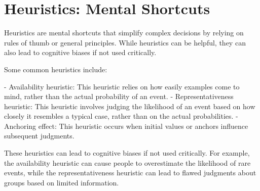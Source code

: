 \section{Heuristics: Mental Shortcuts}
Heuristics are mental shortcuts that simplify complex decisions by relying on rules of thumb or general principles. While heuristics can be helpful, they can also lead to cognitive biases if not used critically.

Some common heuristics include:

- Availability heuristic: This heuristic relies on how easily examples come to mind, rather than the actual probability of an event.
- Representativeness heuristic: This heuristic involves judging the likelihood of an event based on how closely it resembles a typical case, rather than on the actual probabilities.
- Anchoring effect: This heuristic occurs when initial values or anchors influence subsequent judgments.

These heuristics can lead to cognitive biases if not used critically. For example, the availability heuristic can cause people to overestimate the likelihood of rare events, while the representativeness heuristic can lead to flawed judgments about groups based on limited information.